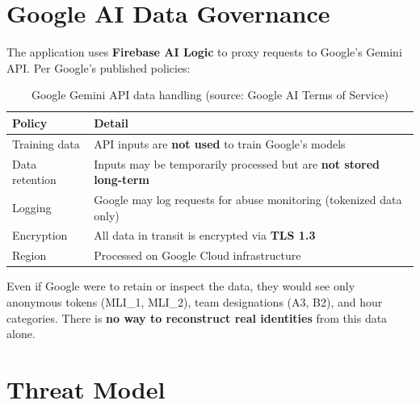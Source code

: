 \documentclass[11pt,letterpaper]{article}
\begin{document}
\section{Google AI Data Governance}

The application uses \textbf{Firebase AI Logic} to proxy requests to Google's Gemini API. Per Google's published policies:

\begin{table}[h]
\centering
\begin{tabularx}{\textwidth}{lX}
\toprule
\textbf{Policy} & \textbf{Detail} \\
\midrule
Training data & API inputs are \textbf{not used} to train Google's models \\
Data retention & Inputs may be temporarily processed but are \textbf{not stored long-term} \\
Logging & Google may log requests for abuse monitoring (tokenized data only) \\
Encryption & All data in transit is encrypted via \textbf{TLS 1.3} \\
Region & Processed on Google Cloud infrastructure \\
\bottomrule
\end{tabularx}
\caption{Google Gemini API data handling (source: Google AI Terms of Service)}
\end{table}

\begin{tcolorbox}[infostyle, title={Defense in Depth}]
Even if Google were to retain or inspect the data, they would see only anonymous tokens (MLI\_1, MLI\_2), team designations (A3, B2), and hour categories. There is \textbf{no way to reconstruct real identities} from this data alone.
\end{tcolorbox}

\section{Threat Model}
\end{document}
